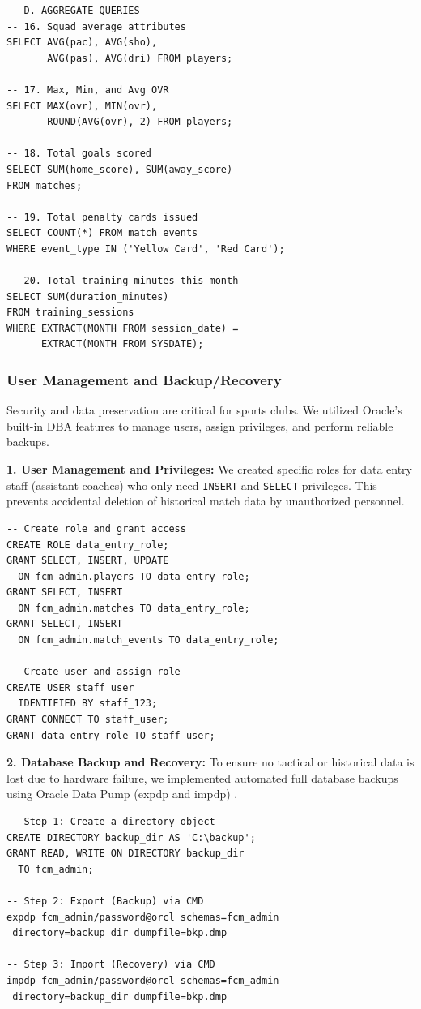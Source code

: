 \documentclass[fonts]{icst}
\begin{document}
\begin{verbatim}
-- D. AGGREGATE QUERIES
-- 16. Squad average attributes
SELECT AVG(pac), AVG(sho), 
       AVG(pas), AVG(dri) FROM players;

-- 17. Max, Min, and Avg OVR
SELECT MAX(ovr), MIN(ovr), 
       ROUND(AVG(ovr), 2) FROM players;

-- 18. Total goals scored
SELECT SUM(home_score), SUM(away_score) 
FROM matches;

-- 19. Total penalty cards issued
SELECT COUNT(*) FROM match_events 
WHERE event_type IN ('Yellow Card', 'Red Card');

-- 20. Total training minutes this month
SELECT SUM(duration_minutes) 
FROM training_sessions 
WHERE EXTRACT(MONTH FROM session_date) = 
      EXTRACT(MONTH FROM SYSDATE);
\end{verbatim}

\subsubsection{User Management and Backup/Recovery}
Security and data preservation are critical for sports clubs. We utilized Oracle's built-in DBA features to manage users, assign privileges, and perform reliable backups.

\textbf{1. User Management and Privileges:}
We created specific roles for data entry staff (assistant coaches) who only need \texttt{INSERT} and \texttt{SELECT} privileges. This prevents accidental deletion of historical match data by unauthorized personnel.
\begin{verbatim}
-- Create role and grant access
CREATE ROLE data_entry_role;
GRANT SELECT, INSERT, UPDATE 
  ON fcm_admin.players TO data_entry_role;
GRANT SELECT, INSERT 
  ON fcm_admin.matches TO data_entry_role;
GRANT SELECT, INSERT 
  ON fcm_admin.match_events TO data_entry_role;

-- Create user and assign role
CREATE USER staff_user 
  IDENTIFIED BY staff_123;
GRANT CONNECT TO staff_user;
GRANT data_entry_role TO staff_user;
\end{verbatim}

\textbf{2. Database Backup and Recovery:}
To ensure no tactical or historical data is lost due to hardware failure, we implemented automated full database backups using Oracle Data Pump (expdp and impdp) \cite{oracle_datapump}.
\begin{verbatim}
-- Step 1: Create a directory object
CREATE DIRECTORY backup_dir AS 'C:\backup';
GRANT READ, WRITE ON DIRECTORY backup_dir 
  TO fcm_admin;

-- Step 2: Export (Backup) via CMD
expdp fcm_admin/password@orcl schemas=fcm_admin 
 directory=backup_dir dumpfile=bkp.dmp 

-- Step 3: Import (Recovery) via CMD
impdp fcm_admin/password@orcl schemas=fcm_admin 
 directory=backup_dir dumpfile=bkp.dmp 
\end{verbatim}
\end{document}
